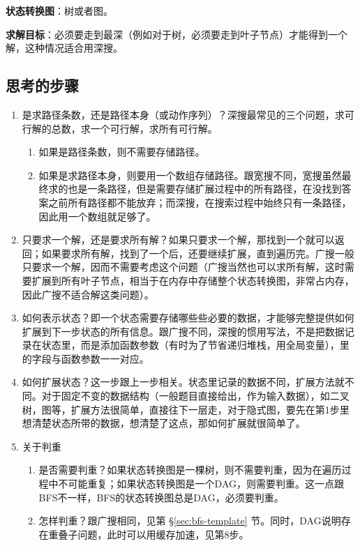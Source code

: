 \textbf{状态转换图}：树或者图。

\textbf{求解目标}：必须要走到最深（例如对于树，必须要走到叶子节点）才能得到一个解，这种情况适合用深搜。


\subsection{思考的步骤}
\begin{enumerate}
	\item 是求路径条数，还是路径本身（或动作序列）？深搜最常见的三个问题，求可行解的总数，求一个可行解，求所有可行解。
	\begin{enumerate}
		\item 如果是路径条数，则不需要存储路径。
		\item 
		如果是求路径本身，则要用一个数组存储路径。跟宽搜不同，宽搜虽然最终求的也是一条路径，但是需要存储扩展过程中的所有路径，在没找到答案之前所有路径都不能放弃；而深搜，在搜索过程中始终只有一条路径，因此用一个数组就足够了。
	\end{enumerate}
	
	\item 
	只要求一个解，还是要求所有解？如果只要求一个解，那找到一个就可以返回；如果要求所有解，找到了一个后，还要继续扩展，直到遍历完。广搜一般只要求一个解，因而不需要考虑这个问题（广搜当然也可以求所有解，这时需要扩展到所有叶子节点，相当于在内存中存储整个状态转换图，非常占内存，因此广搜不适合解这类问题）。
	
	\item 
	如何表示状态？即一个状态需要存储哪些些必要的数据，才能够完整提供如何扩展到下一步状态的所有信息。跟广搜不同，深搜的惯用写法，不是把数据记录在状态里，而是添加函数参数（有时为了节省递归堆栈，用全局变量），里的字段与函数参数一一对应。
	
	\item 
	如何扩展状态？这一步跟上一步相关。状态里记录的数据不同，扩展方法就不同。对于固定不变的数据结构（一般题目直接给出，作为输入数据），如二叉树，图等，扩展方法很简单，直接往下一层走，对于隐式图，要先在第1步里想清楚状态所带的数据，想清楚了这点，那如何扩展就很简单了。
	
	\item 关于判重
	\begin{enumerate}
		\item 是否需要判重？如果状态转换图是一棵树，则不需要判重，因为在遍历过程中不可能重复；如果状态转换图是一个DAG，则需要判重。这一点跟BFS不一样，BFS的状态转换图总是DAG，必须要判重。
		\item 怎样判重？跟广搜相同，见第 \S \ref{sec:bfs-template} 节。同时，DAG说明存在重叠子问题，此时可以用缓存加速，见第8步。
	\end{enumerate}
	

\end{enumerate}
